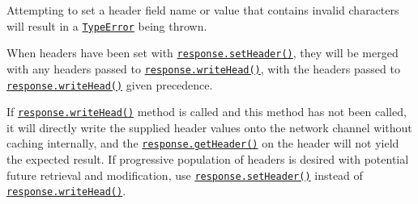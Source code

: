 Attempting to set a header field name or value that contains invalid
characters will result in a
\href{errors.md\#class-typeerror}{\texttt{TypeError}} being thrown.

When headers have been set with
\hyperref[responsesetheadername-value]{\texttt{response.setHeader()}},
they will be merged with any headers passed to
\hyperref[responsewriteheadstatuscode-statusmessage-headers]{\texttt{response.writeHead()}},
with the headers passed to
\hyperref[responsewriteheadstatuscode-statusmessage-headers]{\texttt{response.writeHead()}}
given precedence.

\begin{Shaded}
\begin{Highlighting}[]
\OperatorTok{=}\OperatorTok{,}\KeywordTok{=\textgreater{}}\NormalTok{ \{}
\NormalTok{(}\OperatorTok{,} \NormalTok{)}\OperatorTok{;}
\NormalTok{(}\OperatorTok{,} \NormalTok{)}\OperatorTok{;}
\NormalTok{(}\OperatorTok{,}\NormalTok{ \{ }\OperatorTok{:} \NormalTok{ \})}\OperatorTok{;}
\NormalTok{(}\NormalTok{)}\OperatorTok{;}
\NormalTok{\})}\OperatorTok{;}
\end{Highlighting}
\end{Shaded}

If
\hyperref[responsewriteheadstatuscode-statusmessage-headers]{\texttt{response.writeHead()}}
method is called and this method has not been called, it will directly
write the supplied header values onto the network channel without
caching internally, and the
\hyperref[responsegetheadername]{\texttt{response.getHeader()}} on the
header will not yield the expected result. If progressive population of
headers is desired with potential future retrieval and modification, use
\hyperref[responsesetheadername-value]{\texttt{response.setHeader()}}
instead of
\hyperref[responsewriteheadstatuscode-statusmessage-headers]{\texttt{response.writeHead()}}.

